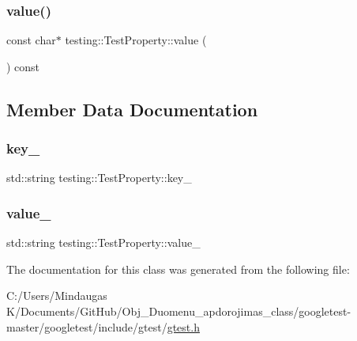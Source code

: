\mbox{\label{classtesting_1_1_test_property_ad423a07af33c88b0c9ed33ee74815a63}} 
\subsubsection{\texorpdfstring{value()}{value()}\hspace{0.1cm}{\footnotesize\ttfamily [3/3]}}
{\footnotesize\ttfamily const char$\ast$ testing\+::\+Test\+Property\+::value (\begin{DoxyParamCaption}{ }\end{DoxyParamCaption}) const\hspace{0.3cm}{\ttfamily [inline]}}



\subsection{Member Data Documentation}
\mbox{\label{classtesting_1_1_test_property_a948544067d61e790bd37e234186fa708}} 
\subsubsection{\texorpdfstring{key\_}{key\_}}
{\footnotesize\ttfamily std\+::string testing\+::\+Test\+Property\+::key\+\_\+\hspace{0.3cm}{\ttfamily [private]}}

\mbox{\label{classtesting_1_1_test_property_a204e3793205a1e61412fc34be1913c01}} 
\subsubsection{\texorpdfstring{value\_}{value\_}}
{\footnotesize\ttfamily std\+::string testing\+::\+Test\+Property\+::value\+\_\+\hspace{0.3cm}{\ttfamily [private]}}



The documentation for this class was generated from the following file\+:\begin{DoxyCompactItemize}
\item 
C\+:/\+Users/\+Mindaugas K/\+Documents/\+Git\+Hub/\+Obj\+\_\+\+Duomenu\+\_\+apdorojimas\+\_\+class/googletest-\/master/googletest/include/gtest/\mbox{\hyperlink{googletest-master_2googletest_2include_2gtest_2gtest_8h}{gtest.\+h}}\end{DoxyCompactItemize}
